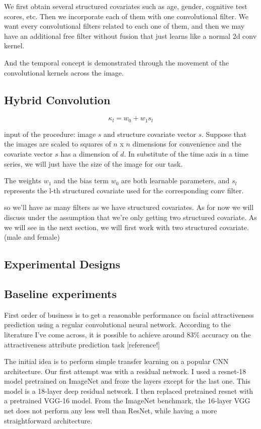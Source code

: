 \documentclass[12pt]{article}
\begin{document}
We first obtain several structured covariates such as age, gender, cognitive test scores, etc. Then we incorporate each of them with one convolutional filter. We want every convolutional filters related to each one of them, and then we may have an additional free filter without fusion that just learns like a normal 2d conv kernel. 

And the temporal concept is demonstrated through the movement of the convolutional kernels across the image.

\subsection{Hybrid Convolution}

$$\kappa_l = w_0 + w_1 s_l$$ 

input of the procedure: image $s$ and structure covariate vector $s$.
Suppose that the images are scaled to squares of $n$ x $n$ dimensions for convenience and the covariate vector $s$ has a dimension of $d$. In substitute of the time axis in a time series, we will just have the size of the image for our task. 

The weights $w_1$ and the bias term $w_0$ are both learnable parameters, and $s_l$ represents the l-th structured covariate used for the corresponding conv filter.  

so we'll have as many filters as we have structured covariates.
As for now we will discuss under the assumption that we're only getting two structured covariate. As we will see in the next section, we will first work with two structured covariate. (male and female) 

\subsection{Experimental Designs}


\subsection{Baseline experiments}
First order of business is to get a reasonable performance on facial attractiveness prediction using a regular convolutional neural network. According to the literature I've come across, it is possible to achieve around 83\% accuracy on the attractiveness attribute prediction task [reference!]

The initial idea is to perform simple transfer learning on a popular CNN architecture. Our first attempt was with a residual network. I used a resnet-18 model pretrained on ImageNet and froze the layers except for the last one. This model is a 18-layer deep residual network. I then replaced pretrained resnet with a pretrained VGG-16 model. From the ImageNet benchmark, the 16-layer VGG net does not perform any less well than ResNet, while having a more straightforward architecture. 
\end{document}
